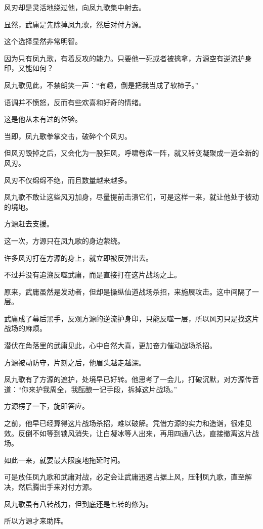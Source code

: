 \begin{this_body}
风刃却是灵活地绕过他，向凤九歌集中射去。

显然，武庸是先除掉凤九歌，然后对付方源。

这个选择显然非常明智。

因为只有凤九歌，有着反攻的能力。只要他一死或者被擒拿，方源空有逆流护身印，又能如何？

凤九歌见此，不禁朗笑一声：“有趣，倒是把我当成了软柿子。”

语调并不愤怒，反而有些欢喜和好奇的情绪。

这是他从未有过的体验。

当即，凤九歌拳掌交击，破碎个个风刃。

但风刃毁掉之后，又会化为一股狂风，呼啸卷席一阵，就又转变凝聚成一道全新的风刃。

风刃不仅绵绵不绝，而且数量越来越多。

凤九歌不敢让这些风刃加身，尽量提前击溃它们，可是这样一来，就让他处于被动的境地。

方源赶去支援。

这一次，方源只在凤九歌的身边萦绕。

许多风刃打在方源的身上，就立即被反弹出去。

不过并没有追溯反噬武庸，而是直接打在这片战场之上。

原来，武庸虽然是发动者，但却是操纵仙道战场杀招，来施展攻击。这中间隔了一层。

武庸成了幕后黑手，反观方源的逆流护身印，只能反噬一层，所以风刃只是找这片战场的麻烦。

潜伏在角落里的武庸见此，心中自然大喜，更加奋力催动战场杀招。

方源被动防守，片刻之后，他眉头越走越深。

凤九歌有了方源的遮护，处境早已好转。他思考了一会儿，打破沉默，对方源传音道：“你来护我周全，我酝酿一记手段，拆掉这片战场。”

方源楞了一下，旋即答应。

之前，他早已经算得这片战场杀招，难以破解。凭借方源的实力和造诣，很难见效。反倒不如等到锁风消失，让白凝冰等人出来，再用四通八达，直接撤离这片战场。

如此一来，就要最大限度地拖延时间。

可是放任凤九歌和武庸对战，必定会让武庸迅速占据上风，压制凤九歌，直至解决，然后腾出手来对付方源。

凤九歌虽有八转战力，但到底还是七转的修为。

所以方源才来助阵。


\end{this_body}
